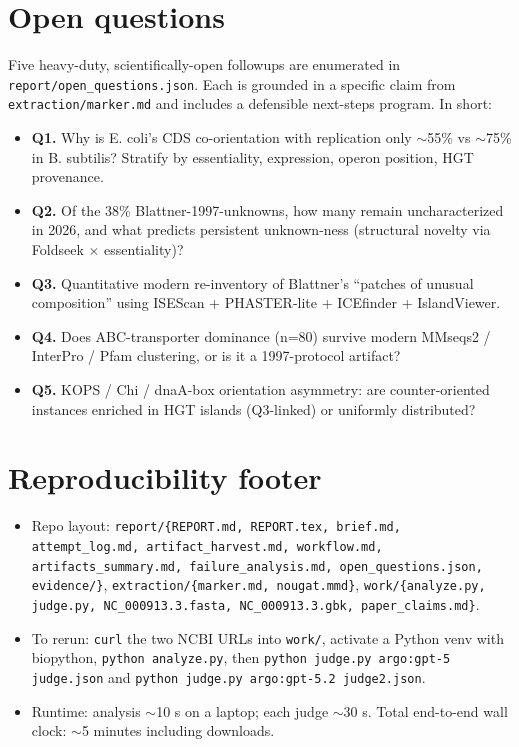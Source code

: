 \documentclass[11pt,letterpaper]{article}
\begin{document}
\section{Open questions}

Five heavy-duty, scientifically-open followups are enumerated in
\texttt{report/open\_questions.json}. Each is grounded in a specific claim from
\texttt{extraction/marker.md} and includes a defensible next-steps program. In short:

\begin{itemize}[nosep, leftmargin=1.4em]
  \item \textbf{Q1.} Why is E. coli's CDS co-orientation with replication only $\sim$55\% vs
    $\sim$75\% in B. subtilis? Stratify by essentiality, expression, operon position, HGT provenance.
  \item \textbf{Q2.} Of the 38\% Blattner-1997-unknowns, how many remain uncharacterized in 2026,
    and what predicts persistent unknown-ness (structural novelty via Foldseek $\times$ essentiality)?
  \item \textbf{Q3.} Quantitative modern re-inventory of Blattner's ``patches of unusual composition''
    using ISEScan + PHASTER-lite + ICEfinder + IslandViewer.
  \item \textbf{Q4.} Does ABC-transporter dominance (n=80) survive modern MMseqs2 / InterPro / Pfam
    clustering, or is it a 1997-protocol artifact?
  \item \textbf{Q5.} KOPS / Chi / dnaA-box orientation asymmetry: are counter-oriented instances
    enriched in HGT islands (Q3-linked) or uniformly distributed?
\end{itemize}

\section*{Reproducibility footer}

\begin{itemize}[nosep, leftmargin=1.4em]
  \item Repo layout:
    \texttt{report/\{REPORT.md, REPORT.tex, brief.md, attempt\_log.md, artifact\_harvest.md,
    workflow.md, artifacts\_summary.md, failure\_analysis.md, open\_questions.json, evidence/\}},
    \texttt{extraction/\{marker.md, nougat.mmd\}},
    \texttt{work/\{analyze.py, judge.py, NC\_000913.3.fasta, NC\_000913.3.gbk, paper\_claims.md\}}.
  \item To rerun: \texttt{curl} the two NCBI URLs into \texttt{work/}, activate a Python venv
    with biopython, \texttt{python analyze.py}, then \texttt{python judge.py argo:gpt-5 judge.json}
    and \texttt{python judge.py argo:gpt-5.2 judge2.json}.
  \item Runtime: analysis $\sim$10 s on a laptop; each judge $\sim$30 s. Total end-to-end wall
    clock: $\sim$5 minutes including downloads.
\end{itemize}
\end{document}
